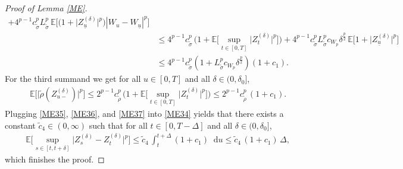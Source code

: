 \documentclass[11pt,a4paper]{article}
\numberwithin{equation}{section}
\theoremstyle{definition}
\newcommand{\E}{{\mathbb{E}}}
\newcommand{\diff}{\mathop{}\!\mathrm{d}}
\begin{document}
\begin{proof}[Proof of Lemma \ref{ME}]
\begin{equation}
\begin{aligned}
    + 4^{p-1} c_{\widetilde\sigma}^p L_{\widetilde\sigma}^p\, \E\big[  \big(1+\big|Z^{(\delta)}_{\underline u}\big|^p\big) |W_u -W_{\underline u}|^p\big]\\
    &\leq 4^{p-1} c_{\widetilde\sigma}^p\, \big( 1+ \E\big[\sup_{t\in[0,T]}\big|Z^{(\delta)}_{t}\big|^p\big]\big)
    + 4^{p-1} c_{\widetilde\sigma}^p L_{\widetilde\sigma}^p c_{W_p} \delta^\frac{p}{2} \, \E\big[   1+\big|Z^{(\delta)}_{\underline u}\big|^p\big]\\
    &\leq4^{p-1} c_{\widetilde\sigma}^p ( 1 +  L_{\widetilde\sigma}^p c_{W_p} \delta^{\frac{p}{2}} )( 1+ c_1).
    \end{aligned}
\end{equation}
For the third summand we get for all $u\in[0,T]$ and all $\delta\in(0,\delta_0]$,
\begin{equation}\label{ME37}
    \begin{aligned}
    &\E\Big[\big| \widetilde\rho (Z^{(\delta)}_{u-}) \big|^p \Big] 
    \leq 2^{p-1} c_{\widetilde\rho}^p \, \big(1+\E\big[\sup_{t\in[0,T]}\big|Z^{(\delta)}_{t}\big|^p\big]\big)
    \leq 2^{p-1} c_{\widetilde\rho}^p \,(1+c_1).
    \end{aligned}
\end{equation}
Plugging \eqref{ME35}, \eqref{ME36}, and \eqref{ME37} into \eqref{ME34} yields that there exists a constant $\widetilde c_4\in(0,\infty)$ such that for all $t\in[0,T-\Delta]$ and all $\delta\in(0,\delta_0]$,
\begin{equation}\label{ME38}
    \begin{aligned}
    &\E\Big[\sup_{s\in[t,t+\delta]} \big|Z^{(\delta)}_s- Z^{(\delta)}_{t}\big|^p\Big]
    \leq \widetilde c_4\, \int_{t}^{t+\Delta}( 1+ c_1) \diff u \leq \widetilde c_4\,(1+  c_1 )\, \Delta,
    \end{aligned}
\end{equation}
which finishes the proof.
\end{proof}
\end{document}

